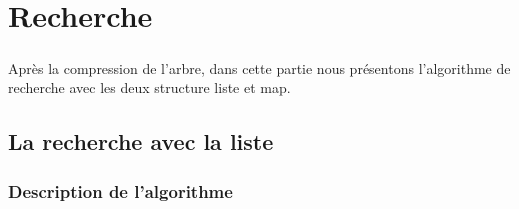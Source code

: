 \chapter{Recherche}
\paragraph{}
Après la compression de l'arbre, dans cette partie nous présentons l'algorithme de recherche avec les deux structure liste et map.

\section{La recherche avec la liste}
\subsection{Description de l'algorithme}
